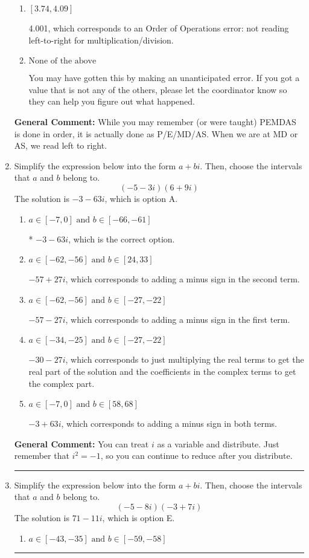 \documentclass{extbook}[14pt]
\newcommand{\litem}[1]{\item #1

\rule{\textwidth}{0.4pt}}
\begin{document}
\begin{enumerate}
{\begin{enumerate}[label=\Alph*.]
 22.115, which corresponds to an Order of Operations error: multiplying by negative before squaring. For example: $(-3)^2 \neq -3^2$
\item \( [3.74, 4.09] \)

 4.001, which corresponds to an Order of Operations error: not reading left-to-right for multiplication/division.
\item \( \text{None of the above} \)

 You may have gotten this by making an unanticipated error. If you got a value that is not any of the others, please let the coordinator know so they can help you figure out what happened.
\end{enumerate}

\textbf{General Comment:} While you may remember (or were taught) PEMDAS is done in order, it is actually done as P/E/MD/AS. When we are at MD or AS, we read left to right.
}
\litem{
Simplify the expression below into the form $a+bi$. Then, choose the intervals that $a$ and $b$ belong to.
\[ (-5 - 3 i)(6 + 9 i) \]The solution is \( -3 - 63 i \), which is option A.\begin{enumerate}[label=\Alph*.]
\item \( a \in [-7, 0] \text{ and } b \in [-66, -61] \)

* $-3 - 63 i$, which is the correct option.
\item \( a \in [-62, -56] \text{ and } b \in [24, 33] \)

 $-57 + 27 i$, which corresponds to adding a minus sign in the second term.
\item \( a \in [-62, -56] \text{ and } b \in [-27, -22] \)

 $-57 - 27 i$, which corresponds to adding a minus sign in the first term.
\item \( a \in [-34, -25] \text{ and } b \in [-27, -22] \)

 $-30 - 27 i$, which corresponds to just multiplying the real terms to get the real part of the solution and the coefficients in the complex terms to get the complex part.
\item \( a \in [-7, 0] \text{ and } b \in [58, 68] \)

 $-3 + 63 i$, which corresponds to adding a minus sign in both terms.
\end{enumerate}

\textbf{General Comment:} You can treat $i$ as a variable and distribute. Just remember that $i^2=-1$, so you can continue to reduce after you distribute.
}
\litem{
Simplify the expression below into the form $a+bi$. Then, choose the intervals that $a$ and $b$ belong to.
\[ (-5 - 8 i)(-3 + 7 i) \]The solution is \( 71 - 11 i \), which is option E.\begin{enumerate}[label=\Alph*.]
\item \( a \in [-43, -35] \text{ and } b \in [-59, -58] \)


\end{enumerate}}
\end{enumerate}
\end{document}
